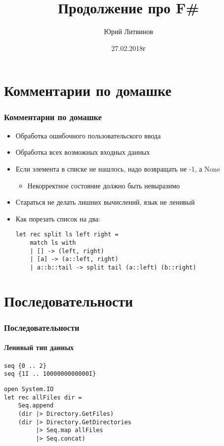 \documentclass[xetex,mathserif,serif]{beamer}
\title{Продолжение про F\#}
\author{Юрий Литвинов}
\date{27.02.2018г}
\begin{document}
	
	\frame{\titlepage}

	\section{Комментарии по домашке}

	\begin{frame}[fragile]
		\frametitle{Комментарии по домашке}
		\begin{itemize}
			\item Обработка ошибочного пользовательского ввода
			\item Обработка всех возможных входных данных
			\item Если элемента в списке не нашлось, надо возвращать не -1, а None
			\begin{itemize}
				\item Некорректное состояние должно быть невыразимо
			\end{itemize}
			\item Стараться не делать лишних вычислений, язык не ленивый
			\item Как порезать список на два:
				\begin{verbatim}
let rec split ls left right =
    match ls with
    | [] -> (left, right)
    | [a] -> (a::left, right)
    | a::b::tail -> split tail (a::left) (b::right)
				\end{verbatim}
		\end{itemize}
	\end{frame}

	\section{Последовательности}
	
	\begin{frame}[fragile]
		\frametitle{Последовательности}
		\framesubtitle{Ленивый тип данных}
		\begin{verbatim}
seq {0 .. 2}
seq {1I .. 1000000000000I}
		\end{verbatim}

		\begin{verbatim}
open System.IO
let rec allFiles dir =
    Seq.append
    (dir |> Directory.GetFiles)
    (dir |> Directory.GetDirectories 
         |> Seq.map allFiles 
         |> Seq.concat)
		\end{verbatim}
	\end{frame}
\end{document}
